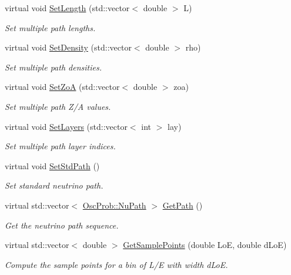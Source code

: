 \begin{DoxyCompactItemize}
virtual void \hyperlink{classOscProb_1_1PMNS__Base_aa34a40a3b5abda0f252982d9ead3b520}{Set\+Length} (std\+::vector$<$ double $>$ L)
\begin{DoxyCompactList}\small\item\em Set multiple path lengths. \end{DoxyCompactList}\item 
virtual void \hyperlink{classOscProb_1_1PMNS__Base_a858221d5510fe732dc6a101fd305cda0}{Set\+Density} (std\+::vector$<$ double $>$ rho)
\begin{DoxyCompactList}\small\item\em Set multiple path densities. \end{DoxyCompactList}\item 
virtual void \hyperlink{classOscProb_1_1PMNS__Base_a8495f8a320e1a21965e6a64aec92ad2a}{Set\+ZoA} (std\+::vector$<$ double $>$ zoa)
\begin{DoxyCompactList}\small\item\em Set multiple path Z/A values. \end{DoxyCompactList}\item 
virtual void \hyperlink{classOscProb_1_1PMNS__Base_a904e580edf89fb98bf9a6397739b4ebe}{Set\+Layers} (std\+::vector$<$ int $>$ lay)
\begin{DoxyCompactList}\small\item\em Set multiple path layer indices. \end{DoxyCompactList}\item 
virtual void \hyperlink{classOscProb_1_1PMNS__Base_add6533a9fc9acdfc7ae258b62570d78d}{Set\+Std\+Path} ()
\begin{DoxyCompactList}\small\item\em Set standard neutrino path. \end{DoxyCompactList}\item 
virtual std\+::vector$<$ \hyperlink{structOscProb_1_1NuPath}{Osc\+Prob\+::\+Nu\+Path} $>$ \hyperlink{classOscProb_1_1PMNS__Base_ac8e196f2e85a2b1caaf705073ee95a5c}{Get\+Path} ()
\begin{DoxyCompactList}\small\item\em Get the neutrino path sequence. \end{DoxyCompactList}\item 
virtual std\+::vector$<$ double $>$ \hyperlink{classOscProb_1_1PMNS__Base_a9eac8d768c1424755ee41f7e783af179}{Get\+Sample\+Points} (double LoE, double d\+LoE)
\begin{DoxyCompactList}\small\item\em Compute the sample points for a bin of L/E with width d\+LoE. \end{DoxyCompactList}\end{DoxyCompactItemize}
